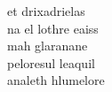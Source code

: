 \documentclass{minimal}
\begin{document}
\centering 
{\fontsize{75pt}{10pt} \tovian 

et drixadrielas\\
na el lothre eaiss \\
mah glaranane\\
peloresul leaquil \\
analeth hlumelore



}
\end{document}
